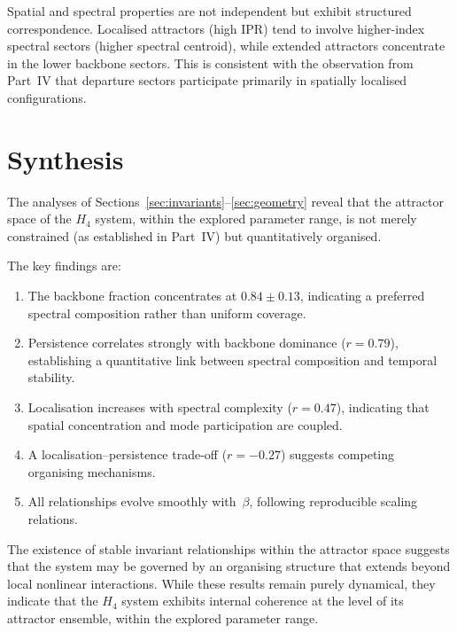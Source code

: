 \documentclass[12pt,a4paper]{article}
\newcommand{\Hfour}{H_4}
\begin{document}
Spatial and spectral properties are not independent but exhibit
structured correspondence.  Localised attractors (high IPR) tend
to involve higher-index spectral sectors (higher spectral centroid),
while extended attractors concentrate in the lower backbone sectors.
This is consistent with the observation from Part~IV that departure
sectors participate primarily in spatially localised configurations.


\section{Synthesis}\label{sec:synthesis}

The analyses of Sections~\ref{sec:invariants}--\ref{sec:geometry}
reveal that the attractor space of the $\Hfour$ system, within the
explored parameter range, is not merely constrained (as established
in Part~IV) but quantitatively organised.

The key findings are:

\begin{enumerate}[nosep]
\item The backbone fraction concentrates at $0.84 \pm 0.13$,
  indicating a preferred spectral composition rather than uniform
  coverage.

\item Persistence correlates strongly with backbone dominance
  ($r = 0.79$), establishing a quantitative link between spectral
  composition and temporal stability.

\item Localisation increases with spectral complexity ($r = 0.47$),
  indicating that spatial concentration and mode participation are
  coupled.

\item A localisation--persistence trade-off ($r = -0.27$) suggests
  competing organising mechanisms.

\item All relationships evolve smoothly with~$\beta$, following
  reproducible scaling relations.
\end{enumerate}

The existence of stable invariant relationships within the attractor
space suggests that the system may be governed by an organising
structure that extends beyond local nonlinear interactions.  While
these results remain purely dynamical, they indicate that the
$\Hfour$ system exhibits internal coherence at the level of its
attractor ensemble, within the explored parameter range.
\end{document}
